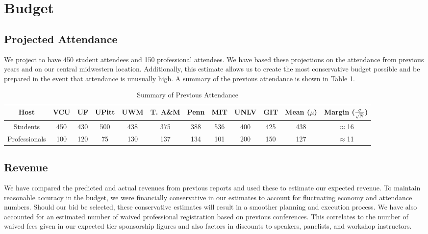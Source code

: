 \section{Budget}


\subsection{Projected Attendance}
We project to have 450 student attendees and 150 professional attendees. We have based these projections on the attendance from previous years and on our central midwestern location. Additionally, this estimate allows us to create the most conservative budget possible and be prepared in the event that attendance is unusually high. A summary of the previous attendance is shown in Table \ref{table:attendance}.

\begin{table}[H]
\caption{Summary of Previous Attendance}
\label{table:attendance}
    \centering
    \begin{tabular}{cccccccccccc}
    \textbf{Host}& VCU & UF & UPitt & UWM & T. A\&M & Penn & MIT & UNLV & GIT & Mean ($\mu$) & Margin ($\frac{\sigma}{\sqrt{N}}$) \\
    \hline
    Students & 450 & 430 & 500 & 438 & 375 & 388 & 536 & 400 & 425 & 438 & $\approx$16 \\
    Professionals & 100 & 120 & 75 & 130 & 137 & 134 & 101 & 200 & 150 & 127 & $\approx$11\\
    \hline
    \end{tabular}
\end{table}

\subsection{Revenue}
We have compared the predicted and actual revenues from previous reports and used these to estimate our expected revenue. To maintain reasonable accuracy in the budget, we were financially conservative in our estimates to account for fluctuating economy and attendance numbers. Should our bid be selected, these conservative estimates will result in a smoother planning and execution process. We have also accounted for an estimated number of waived professional registration based on previous conferences. This  correlates to the number of waived fees given in our expected tier sponsorship figures and also factors in discounts to speakers, panelists, and workshop instructors. \\


